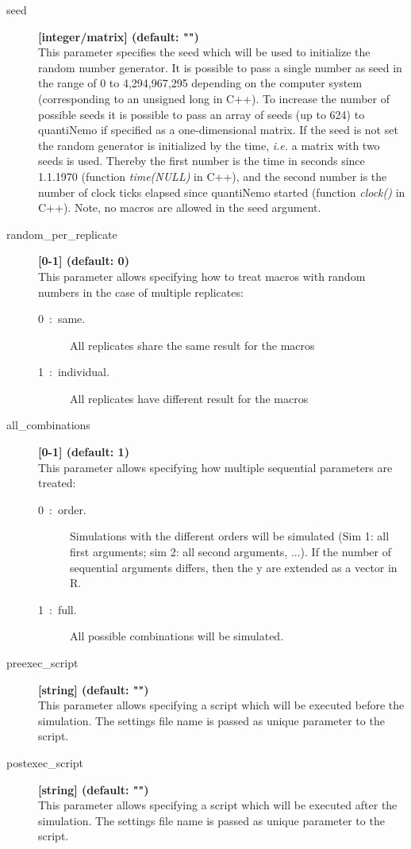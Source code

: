 \documentclass[letterpaper,12pt,oneside]{book}
\begin{document}
\begin{description}
\item[seed] \textbf{[integer/matrix] (default: "")}\\
This parameter specifies the seed which will be used to initialize the random number generator. It is possible to pass a single number as seed in the range of 0 to 4,294,967,295 depending on the computer system (corresponding to an unsigned long in C++). To increase the number of possible seeds it is possible to pass an array of seeds (up to 624) to quantiNemo if specified as a one-dimensional matrix. If the seed is not set the random generator is initialized by the time, \textit{i.e.} a matrix with two seeds is used. Thereby the first number is the time in seconds since 1.1.1970 (function \textit{time(NULL)} in C++), and the second number is the number of clock ticks elapsed since quantiNemo started (function \textit{clock()} in C++). Note, no macros are allowed in the seed argument.\\

\item[random\_per\_replicate] \textbf{[0-1] (default: 0)}\\
This parameter allows specifying how to treat macros with random numbers in the case of multiple replicates:
\begin{description}
    \item[0~:~same.] All replicates share the same result for the macros
    \item[1~:~individual.] All replicates have different result for the macros
\end{description}

\item[all\_combinations] \textbf{[0-1] (default: 1)}\\
This parameter allows specifying how multiple sequential parameters are treated:
\begin{description}
    \item[0~:~order.] Simulations with the different orders will be simulated (Sim 1: all first arguments; sim 2: all second arguments, ...). If the number of sequential arguments differs, then the y are extended as a vector in R.
    \item[1~:~full.] All possible combinations will be simulated. 
\end{description}

\item[preexec\_script] \textbf{[string] (default: "")}\\
This parameter allows specifying a script which will be executed before the simulation. The settings file name is passed as unique parameter to the script.

\item[postexec\_script] \textbf{[string] (default: "")}\\
This parameter allows specifying a script which will be executed after the simulation. The settings file name is passed as unique parameter to the script.
\end{description}
\end{document}
